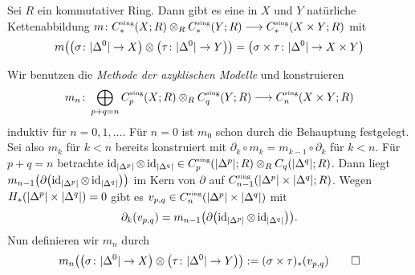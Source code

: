 \begin{proposition}[{name={Existenz}}]
	Sei $R$ ein kommutativer Ring.
	Dann gibt es eine in $X$ und $Y$ natürliche Kettenabbildung 
	\(
		m \colon C^\sing_*(X;R) \otimes_R C^\sing_*(Y;R) \longrightarrow C^\sing_*(X \times Y;R)
	\)
	mit 
	\[
		m \enbrace*{ \enbrace*{\sigma \colon \abs{\Delta^0} \to X } \otimes \enbrace*{\tau \colon \abs{\Delta^0} \to Y}}= \enbrace[\big]{\sigma \times \tau \colon \abs{\Delta^0} \to X \times Y}
	\]
\end{proposition}
\begin{beweis}
	Wir benutzen die \emph{Methode der azyklischen Modelle} und konstruieren 
	\[
		m_n \colon \bigoplus_{p+q=n} C^\sing_p(X;R) \otimes_R C^\sing_q(Y;R) \longrightarrow C^\sing_n(X \times Y;R) 
	\]
	induktiv für $n=0,1,\ldots $.
	Für $n=0$ ist $m_0$ schon durch die Behauptung festgelegt.
	Sei also $m_k$ für $k<n$ bereits konstruiert mit $\partial_k \circ m_k = m_{k-1} \circ \partial_k$ für $k<n$.
	Für $p+q=n$ betrachte $\id_{\abs*{\Delta^p}} \otimes \id_{\abs*{\Delta^q}} \in C^\sing_p(\abs*{\Delta^p};R) \otimes_R C_q \enbrace*{\abs*{\Delta^q};R}$.
	Dann liegt $m_{n-1} \enbrace*{\partial \enbrace*{\id_{\abs*{\Delta^p}} \otimes \id_{\abs*{\Delta^q}}}}$ im Kern von $\partial$ auf $C^\sing_{n-1} \enbrace*{\abs*{\Delta^p} \times \abs*{\Delta^q};R}$.
	Wegen $H_*(\abs*{\Delta^p} \times \abs*{\Delta^q})=0$ gibt es $v_{p,q} \in C^\sing_n \enbrace*{\abs*{\Delta^p} \times \abs*{\Delta^q}}$ mit 
	\[
		\partial_k(v_{p,q}) = m_{n-1} \enbrace*{\partial \enbrace*{\id_{\abs*{\Delta^p} } \otimes \id_{\abs*{\Delta^q}}}}. 
	\]
	Nun definieren wir $m_n$ durch 
	\[
		m_n \enbrace*{ \enbrace*{\sigma \colon \abs{\Delta^0} \to X } \otimes \enbrace*{\tau \colon \abs{\Delta^0} \to Y}} := (\sigma\times \tau)_* \enbrace*{v_{p,q}} \qedhere
	\]
\end{beweis}

